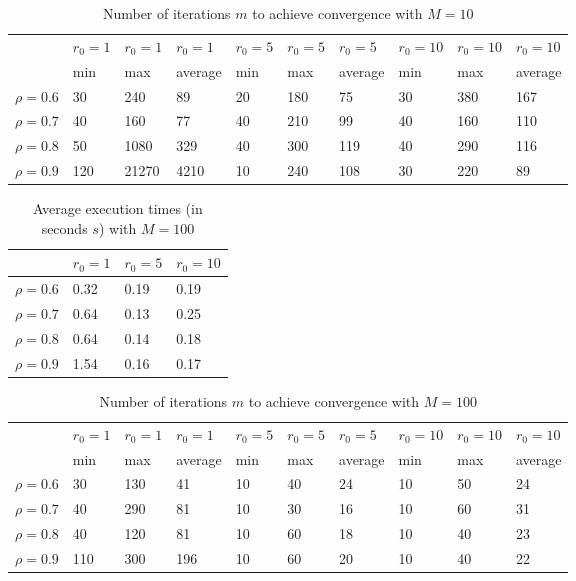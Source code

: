 \documentclass[a4paper,11pt,openright]{report}
\begin{document}
\begin{table}[H]
\centering
\addtolength{\leftskip}{-1.5cm}
\addtolength{\rightskip}{-1.5cm}
\begin{tabular}{|c|lllllllll|}
\hline
$ $ & $r_0 = 1$ & $r_0 = 1$ & $r_0 = 1$ & $r_0 = 5$ & $r_0 = 5$ & $r_0 = 5$ & $r_0 = 10$ & $r_0 = 10$ & $r_0 = 10$  \\
$ $ & min & max & average & min & max & average & min & max & average \\ 
\hline
$\rho = 0.6$ & 30 & 240 & 89 & 20 & 180 & 75 & 30 & 380 & 167\\

$\rho = 0.7$ & 40 & 160 & 77 & 40 & 210 & 99 & 40 & 160 & 110\\

$\rho = 0.8$ & 50 & 1080 & 329 & 40 & 300 & 119 & 40 & 290 & 116\\

$\rho = 0.9$ & 120 & 21270 & 4210 & 10 & 240 & 108 & 30 & 220 & 89\\
\hline
\end{tabular}
\caption{Number of iterations $m$ to achieve convergence with $M = 10$}
\end{table}
\begin{table}[H]
\centering
\addtolength{\leftskip}{-1.5cm}
\addtolength{\rightskip}{-1.5cm}
\begin{tabular}{|c|lll|}
\hline
$ $ & $r_0 = 1$ & $r_0 = 5$ & $r_0 = 10$ \\
\hline
$\rho = 0.6$ & 0.32 & 0.19 & 0.19 \\

$\rho = 0.7$ & 0.64 & 0.13 & 0.25 \\

$\rho = 0.8$ & 0.64 & 0.14 & 0.18 \\

$\rho = 0.9$ & 1.54 & 0.16 & 0.17 \\
\hline
\end{tabular}
\caption{Average execution
 times (in seconds $s$) with $M = 100$}
\end{table}
\begin{table}[H]
\centering
\addtolength{\leftskip}{-1.5cm}
\addtolength{\rightskip}{-1.5cm}
\begin{tabular}{|c|lllllllll|}
\hline
$ $ & $r_0 = 1$ & $r_0 = 1$ & $r_0 = 1$ & $r_0 = 5$ & $r_0 = 5$ & $r_0 = 5$ & $r_0 = 10$ & $r_0 = 10$ & $r_0 = 10$  \\
$ $ & min & max & average & min & max & average & min & max & average \\ 
\hline
$\rho = 0.6$ & 30 & 130 & 41 & 10 & 40 & 24 & 10 & 50 & 24\\

$\rho = 0.7$ & 40 & 290 & 81 & 10 & 30 & 16 & 10 & 60 & 31\\

$\rho = 0.8$ & 40 & 120 & 81 & 10 & 60 & 18 & 10 & 40 & 23\\

$\rho = 0.9$ & 110 & 300 & 196 & 10 & 60 & 20 & 10 & 40 & 22\\
\hline
\end{tabular}
\caption{Number of iterations $m$ to achieve convergence with $M = 100$}
\end{table}
\end{document}
